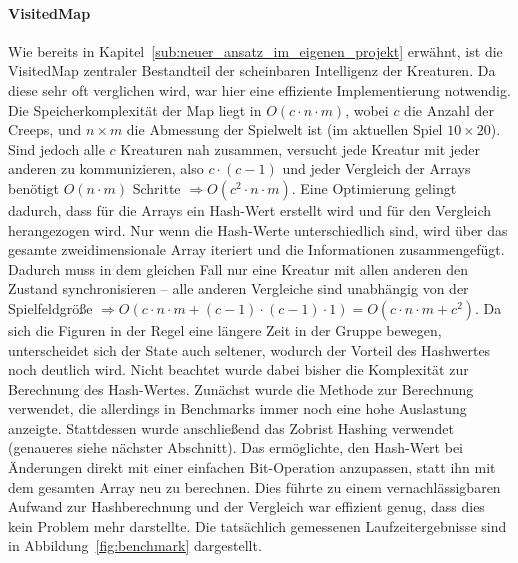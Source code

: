 \paragraph{VisitedMap} %
\label{par:visitedmap}
Wie bereits in Kapitel~\ref{sub:neuer_ansatz_im_eigenen_projekt} erwähnt, ist die VisitedMap zentraler Bestandteil der scheinbaren Intelligenz der Kreaturen. Da diese sehr oft verglichen wird, war hier eine effiziente Implementierung notwendig. Die Speicherkomplexität der Map liegt in \(O (c\cdot n \cdot m)\), wobei \(c\) die Anzahl der Creeps, und \(n\times m\) die Abmessung der Spielwelt ist (im aktuellen Spiel \(10\times20\)). Sind jedoch alle \(c\) Kreaturen nah zusammen, versucht jede Kreatur mit jeder anderen zu kommunizieren, also \(c\cdot (c-1)\) und jeder Vergleich der Arrays benötigt \(O(n\cdot m)\) Schritte \(\Rightarrow O(c^2\cdot n\cdot m)\). Eine Optimierung gelingt dadurch, dass für die Arrays ein Hash-Wert erstellt wird und für den Vergleich herangezogen wird. Nur wenn die Hash-Werte unterschiedlich sind, wird über das gesamte zweidimensionale Array iteriert und die Informationen zusammengefügt. Dadurch muss in dem gleichen Fall nur eine Kreatur mit allen anderen den Zustand synchronisieren -- alle anderen Vergleiche sind unabhängig von der Spielfeldgröße \(\Rightarrow O(c\cdot n \cdot m + (c-1)\cdot(c-1)\cdot1) = O(c \cdot n \cdot m + c^2) \). Da sich die Figuren in der Regel eine längere Zeit in der Gruppe bewegen, unterscheidet sich der State auch seltener, wodurch der Vorteil des Hashwertes noch deutlich wird. Nicht beachtet wurde dabei bisher die Komplexität zur Berechnung des Hash-Wertes. Zunächst wurde die Methode  zur Berechnung verwendet, die allerdings in Benchmarks immer noch eine hohe Auslastung anzeigte. Stattdessen wurde anschließend das Zobrist Hashing \cite{zobrist1970new} verwendet (genaueres siehe nächster Abschnitt). Das ermöglichte, den Hash-Wert bei Änderungen direkt mit einer einfachen Bit-Operation anzupassen, statt ihn mit dem gesamten Array neu zu berechnen. Dies führte zu einem vernachlässigbaren Aufwand zur Hashberechnung und der Vergleich war effizient genug, dass dies kein Problem mehr darstellte. Die tatsächlich gemessenen Laufzeitergebnisse sind in Abbildung~\ref{fig:benchmark} dargestellt.
